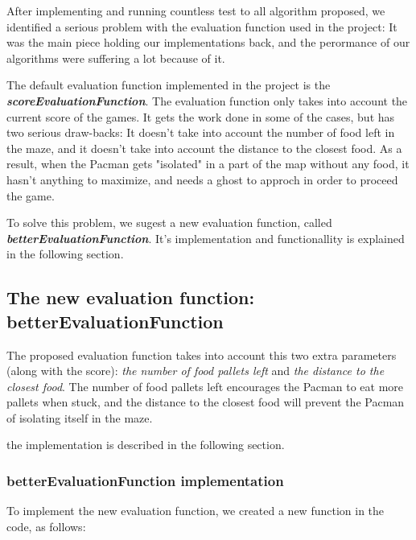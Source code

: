 \documentclass{article}
\begin{document}
After implementing and running countless test to all algorithm proposed, we identified a serious problem with the evaluation function used in the project: It was the main piece holding our implementations back, and the perormance of our algorithms were suffering a lot because of it.

The default evaluation function implemented in the project is the \textit{\textbf{scoreEvaluationFunction}}. The evaluation function only takes into account the current score of the games. It gets the work done in some of the cases, but has two serious draw-backs: It doesn't take into account the number of food left in the maze, and it doesn't take into account the distance to the closest food. As a result, when the Pacman gets "isolated" in a part of the map without any food, it hasn't anything to maximize, and needs a ghost to approch in order to proceed the game.

To solve this problem, we sugest a new evaluation function, called \textit{\textbf{betterEvaluationFunction}}. It's implementation and functionallity is explained in the following section.

\subsection{The new evaluation function: betterEvaluationFunction}

The proposed evaluation function takes into account this two extra parameters (along with the score): \textit{the number of food pallets left} and \textit{the distance to the closest food}. The number of food pallets left encourages the Pacman to eat more pallets when stuck, and the distance to the closest food will prevent the Pacman of isolating itself in the maze.

the implementation is described in the following section.

\subsubsection{betterEvaluationFunction implementation}

To implement the new evaluation function, we created a new function in the code, as follows:
\end{document}
